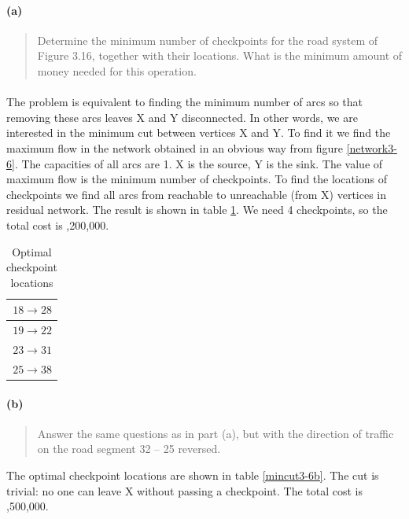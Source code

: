 \paragraph{(a)}
\begin{quote}
Determine the minimum number of checkpoints for the road system of Figure 3.16, together with their locations. What is the minimum amount of money needed for this operation.
\end{quote}

\paragraph{}
The problem is equivalent to finding the minimum number of arcs so that removing these arcs leaves X and Y disconnected. In other words, we are interested in the minimum cut between vertices X and Y. To find it we find the maximum flow in the network obtained in an obvious way from figure \ref{network3-6}. The capacities of all arcs are 1. X is the source, Y is the sink. The value of maximum flow is the minimum number of checkpoints. To find the locations of checkpoints we find all arcs from reachable to unreachable (from X) vertices in residual network. The result is shown in table \ref{mincut3-6a}. We need 4 checkpoints, so the total cost is ,200,000.

\begin{table}[H]
\centering
\begin{tabular}{|r|}
\hline
$18 \rightarrow 28$ \\ \hline
$19 \rightarrow 22$ \\ \hline
$23 \rightarrow 31$ \\ \hline
$25 \rightarrow 38$ \\ \hline
\end{tabular}
\caption{Optimal checkpoint locations}
\label{mincut3-6a}
\end{table}

\paragraph{(b)}
\begin{quote}
Answer the same questions as in part (a), but with the direction of traffic on the road segment 32 – 25 reversed.
\end{quote}

The optimal checkpoint locations are shown in table \ref{mincut3-6b}. The cut is trivial: no one can leave X without passing a checkpoint. The total cost is ,500,000.

